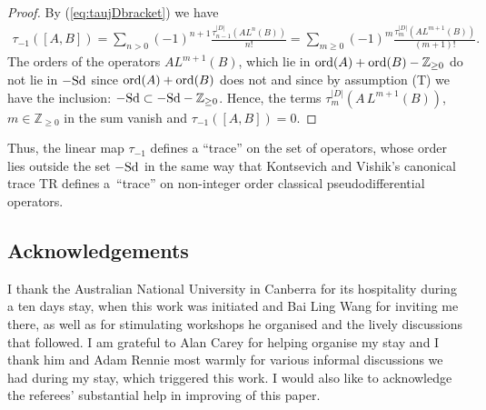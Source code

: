 \documentclass[pdftex]{sigma}
\def \Z {\mathbb Z}
\numberwithin{equation}{section}
\begin{document}
\begin{proof}
By (\ref{eq:taujDbracket}) we have
\begin{gather*}
\tau_{-1}([A,B]) = \sum_{n> 0} (-1)^{n+1}\frac{\tau_{n-1}^{\vert D\vert} \left(
    A L^n(B)\right)}{n!}
 =  \sum_{m\geq  0} (-1)^{m}\frac{\tau_{m}^{\vert D\vert} \left(
    A L^{m+1}(B)\right)}{(m+1)!}.
\end{gather*}
The orders of the  operators
  $  A  L^{m+1}(B)$, which lie  in ${\rm ord}(A)+ {\rm ord}(B)-\Z_{\geq 0}$  do not lie
  in $-{\rm Sd}$ since   ${\rm ord}(A)+ {\rm ord}(B)$ does not and since by assumption (T) we have the inclusion: $ -{\rm Sd}\subset
-{\rm Sd} -\Z_{\geq 0}$. Hence,
 the terms $\tau_{m}^{\vert D\vert} \left(
    A\,L^{m+1}(B)\right)$, $m\in \Z_{\geq 0}$ in the sum vanish and
$\tau_{-1}([A,B])=0$. \end{proof}

 Thus, the linear map $\tau_{-1}$ def\/ines a ``trace''  on the set of
operators, whose order  lies outside the set $-{\rm Sd}$  in the same way that
Kontsevich and Vishik's canonical trace TR
def\/ines a~``trace'' on non-integer order classical pseudodif\/ferential
operators.



\subsection*{Acknowledgements}  I thank the Australian National University in
Canberra for its hospitality during a ten days stay, when this work was
initiated and  Bai Ling Wang for inviting me there, as well as for stimulating
workshops he organised and the lively discussions that followed. I am grateful
to Alan Carey for helping organise my stay and I thank him and Adam Rennie
most warmly  for
various  informal discussions we had during my stay, which triggered this work. I would also like to acknowledge the referees'
substantial help in improving %
of this paper.
\end{document}
